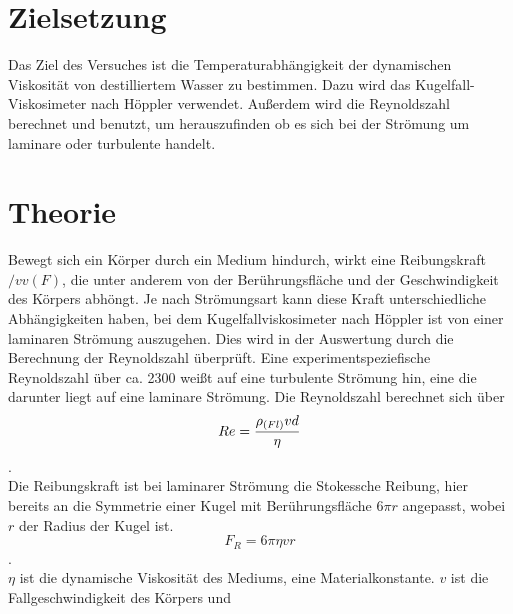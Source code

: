 \section{Zielsetzung}
\label{sec:Zielsetzung}
Das Ziel des Versuches ist die Temperaturabhängigkeit der dynamischen 
Viskosität von destilliertem Wasser zu bestimmen. Dazu wird das Kugelfall-
Viskosimeter nach Höppler verwendet. Außerdem wird die Reynoldszahl 
berechnet und benutzt, um herauszufinden ob es sich bei der Strömung um 
laminare oder turbulente handelt. 
\section{Theorie}
\label{sec:Theorie}
Bewegt sich ein Körper durch ein Medium hindurch, wirkt eine Reibungskraft 
$/vv(F)$, die unter anderem von der Berührungsfläche und der Geschwindigkeit
des Körpers abhöngt. Je nach Strömungsart kann diese Kraft 
unterschiedliche Abhängigkeiten haben, bei dem Kugelfallviskosimeter nach 
Höppler ist von einer laminaren Strömung auszugehen. 
Dies wird in der Auswertung durch die
Berechnung der Reynoldszahl überprüft. Eine experimentspeziefische 
Reynoldszahl über ca. 2300 weißt auf eine turbulente Strömung hin, eine die
darunter liegt auf eine laminare Strömung. Die Reynoldszahl berechnet sich
über $$Re = \frac{\rho_{\text(Fl)} v d}{\eta}$$. \\
Die Reibungskraft ist bei laminarer Strömung die Stokessche Reibung, hier 
bereits an die Symmetrie einer Kugel mit Berührungsfläche $6 \pi r$
angepasst, wobei $r$ der Radius der Kugel ist. 
$$F_{R} = 6 \pi \eta v r$$. \\
$\eta$ ist die dynamische Viskosität des Mediums, eine Materialkonstante.
$v$ ist die Fallgeschwindigkeit des Körpers und 

\cite{sample}